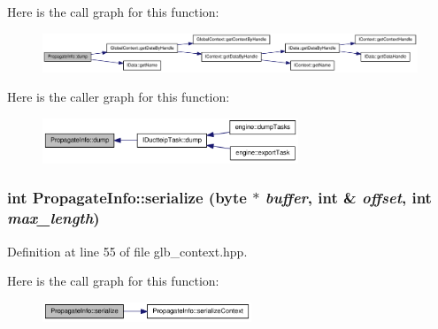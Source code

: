 Here is the call graph for this function:\nopagebreak
\begin{figure}[H]
\begin{center}
\leavevmode
\includegraphics[width=420pt]{struct_propagate_info_a87392639ebf09cbb6bb70edf7dc4c1aa_cgraph}
\end{center}
\end{figure}


Here is the caller graph for this function:\nopagebreak
\begin{figure}[H]
\begin{center}
\leavevmode
\includegraphics[width=217pt]{struct_propagate_info_a87392639ebf09cbb6bb70edf7dc4c1aa_icgraph}
\end{center}
\end{figure}
\hypertarget{struct_propagate_info_ac7242171f175704c50333d053aa72c72}{
\subsubsection[{serialize}]{\setlength{\rightskip}{0pt plus 5cm}int PropagateInfo::serialize ({\bf byte} $\ast$ {\em buffer}, \/  int \& {\em offset}, \/  int {\em max\_\-length})}}
\label{struct_propagate_info_ac7242171f175704c50333d053aa72c72}


Definition at line 55 of file glb\_\-context.hpp.

Here is the call graph for this function:\nopagebreak
\begin{figure}[H]
\begin{center}
\leavevmode
\includegraphics[width=177pt]{struct_propagate_info_ac7242171f175704c50333d053aa72c72_cgraph}
\end{center}
\end{figure}



